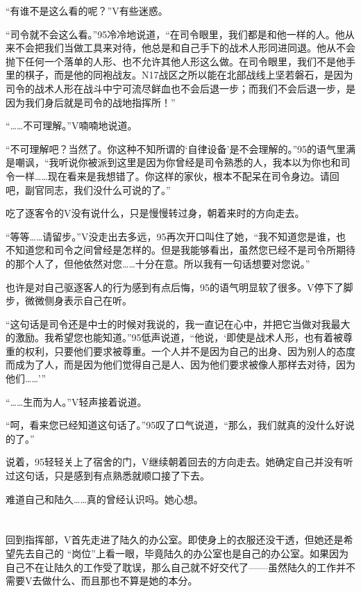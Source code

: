 “有谁不是这么看的呢？”V有些迷惑。

“司令就不会这么看。”95冷冷地说道，“在司令眼里，我们都是和他一样的人。他从来不会把我们当做工具来对待，他总是和自己手下的战术人形同进同退。他从不会抛下任何一个落单的人形、也不允许其他人形这么做。在司令眼里，我们不是他手里的棋子，而是他的同袍战友。N17战区之所以能在北部战线上坚若磐石，是因为司令的战术人形在战斗中宁可流尽鲜血也不会后退一步；而我们不会后退一步，是因为我们身后就是司令的战地指挥所！”

“……不可理解。”V喃喃地说道。

“不可理解吧？当然了。你这种不知所谓的‘自律设备’是不会理解的。”95的语气里满是嘲讽，“我听说你被派到这里是因为你曾经是司令熟悉的人，我本以为你也和司令一样……现在看来是我想错了。你这样的家伙，根本不配呆在司令身边。请回吧，副官同志，我们没什么可说的了。”

吃了逐客令的V没有说什么，只是慢慢转过身，朝着来时的方向走去。

“等等……请留步。”V没走出去多远，95再次开口叫住了她，“我不知道您是谁，也不知道您和司令之间曾经是怎样的。但是我能够看出，虽然您已经不是司令所期待的那个人了，但他依然对您……十分在意。所以我有一句话想要对您说。”

也许是对自己驱逐客人的行为感到有点后悔，95的语气明显软了很多。V停下了脚步，微微侧身表示自己在听。

“这句话是司令还是中士的时候对我说的，我一直记在心中，并把它当做对我最大的激励。我希望您也能知道。”95低声说道，“他说，‘即使是战术人形，也有着被尊重的权利，只要他们要求被尊重。一个人并不是因为自己的出身、因为别人的态度而成为了人，而是因为他们觉得自己是人、因为他们要求被像人那样去对待，因为他们……’”

“……生而为人。”V轻声接着说道。

“呵，看来您已经知道这句话了。”95叹了口气说道，“那么，我们就真的没什么好说的了。”

说着，95轻轻关上了宿舍的门，V继续朝着回去的方向走去。她确定自己并没有听过这句话，只是感到有点熟悉就顺口接了下去。

难道自己和陆久……真的曾经认识吗。她心想。



\section*{}

回到指挥部，V首先走进了陆久的办公室。即使身上的衣服还没干透，但她还是希望先去自己的 “岗位”上看一眼，毕竟陆久的办公室也是自己的办公室。如果因为自己不在让陆久的工作受了耽误，那么自己就不好交代了——虽然陆久的工作并不需要V去做什么、而且那也不算是她的本分。

